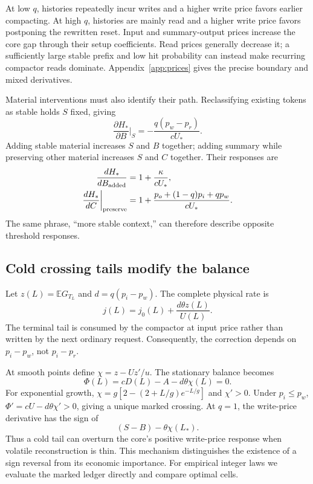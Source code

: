 \documentclass[sigconf,screen,nonacm]{acmart}
\newcommand{\E}{\mathbb{E}}
\newcommand{\Core}{j_0}
\begin{document}
At low $q$, histories repeatedly incur writes and a higher write price favors
earlier compacting. At high $q$, histories are mainly read and a higher write
price favors postponing the rewritten reset. Input and summary-output prices
increase the core gap through their setup coefficients. Read prices generally
decrease it; a sufficiently large stable prefix and low hit probability can
instead make recurring compactor reads dominate. Appendix~\ref{app:prices}
gives the precise boundary and mixed derivatives.

Material interventions must also identify their path. Reclassifying existing
tokens as stable holds $S$ fixed, giving
\begin{equation}
\frac{\partial H_*}{\partial B}\bigg|_S
 =-\frac{q(p_w-p_r)}{cU_*}.
\label{eq:reclass}
\end{equation}
Adding stable material increases $S$ and $B$ together; adding summary while
preserving other material increases $S$ and $C$ together. Their responses are
\begin{align}
\frac{dH_*}{dB_{\rm added}}&=1+\frac{\kappa}{cU_*},\\
\frac{dH_*}{dC}\bigg|_{\rm preserve}
 &=1+\frac{p_o+(1-q)p_i+qp_w}{cU_*}.
\end{align}
The same phrase, ``more stable context,'' can therefore describe opposite
threshold responses.

\subsection{Cold crossing tails modify the balance}
\label{sec:tail}

Let $z(L)=\E G_{T_L}$ and $d=q(p_i-p_w)$. The complete physical rate is
\begin{equation}
j(L)=\Core(L)+\frac{d\theta z(L)}{U(L)}.
\label{eq:marked}
\end{equation}
The terminal tail is consumed by the compactor at input price rather than
written by the next ordinary request. Consequently, the correction depends
on $p_i-p_w$, not $p_i-p_r$.

At smooth points define $\chi=z-Uz'/u$. The stationary balance becomes
\begin{equation}
\Phi(L)=cD(L)-A-d\theta\chi(L)=0.
\label{eq:markedroot}
\end{equation}
For exponential growth,
$\chi=g[2-(2+L/g)e^{-L/g}]$ and $\chi'>0$. Under $p_i\le p_w$,
$\Phi'=cU-d\theta\chi'>0$, giving a unique marked crossing. At $q=1$, the
write-price derivative has the sign of
\begin{equation}
(S-B)-\theta\chi(L_*).
\label{eq:tailreversal}
\end{equation}
Thus a cold tail can overturn the core's positive write-price response when
volatile reconstruction is thin. This mechanism distinguishes the existence
of a sign reversal from its economic importance. For empirical integer laws
we evaluate the marked ledger directly and compare optimal cells.
\end{document}
